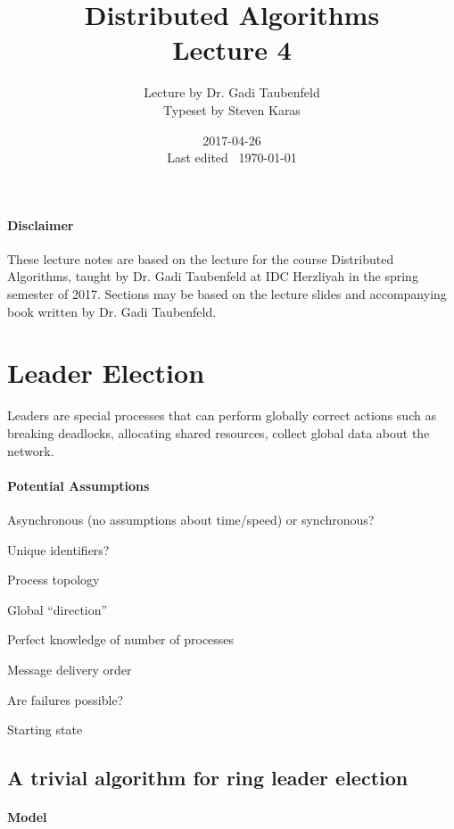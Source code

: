 \documentclass{idc_msc}
\title{Distributed Algorithms\\\large Lecture 4}
\date{2017-04-26 \\ Last edited \currenttime\ \today}
\author{Lecture by Dr. Gadi Taubenfeld\\Typeset by Steven Karas}
\begin{document}
\maketitle

\paragraph{Disclaimer}

These lecture notes are based on the lecture for the course Distributed Algorithms, taught by Dr. Gadi Taubenfeld at IDC Herzliyah in the spring semester of 2017.
Sections may be based on the lecture slides and accompanying book written by Dr. Gadi Taubenfeld.

\section{Leader Election}

Leaders are special processes that can perform globally correct actions such as breaking deadlocks, allocating shared resources, collect global data about the network.

\paragraph{Potential Assumptions}

\begin{itemize*}
  \item Asynchronous (no assumptions about time/speed) or synchronous?
  \item Unique identifiers?
  \item Process topology
  \item Global ``direction''
  \item Perfect knowledge of number of processes
  \item Message delivery order
  \item Are failures possible?
  \item Starting state
\end{itemize*}

\subsection{A trivial algorithm for ring leader election}

\paragraph{Model}
\end{document}
